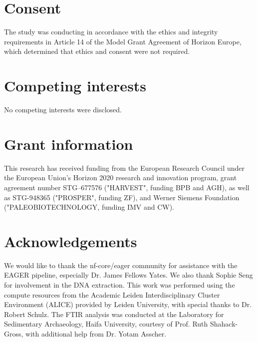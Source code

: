 \documentclass[10pt,a4paper]{article}
\begin{document}
\section*{Consent}

The study was conducting in accordance with the ethics and integrity requirements in Article 14 of the Model Grant Agreement of Horizon Europe,
which determined that ethics and consent were not required.

\section*{Competing interests}

No competing interests were disclosed.

\section*{Grant information}

This research has received funding from the European Research Council under the
European Union’s Horizon 2020 research and innovation program, grant agreement
number STG–677576 ("HARVEST", funding BPB and AGH), as well as STG-948365 ("PROSPER", funding ZF),
and Werner Siemens Foundation ("PALEOBIOTECHNOLOGY, funding IMV and CW).

\section*{Acknowledgements}

We would like to thank the nf-core/eager community for assistance with the
EAGER pipeline, especially Dr. James Fellows Yates. We also thank Sophie Seng
for involvement in the DNA extraction. This work was performed using the compute
resources from the Academic Leiden Interdisciplinary Cluster Environment (ALICE)
provided by Leiden University, with special thanks to Dr. Robert Schulz.
The FTIR analysis was conducted at the Laboratory for Sedimentary Archaeology,
Haifa University, courtesy of Prof. Ruth Shahack-Gross, with additional help from
Dr. Yotam Asscher.

{\small
}

\end{document}
